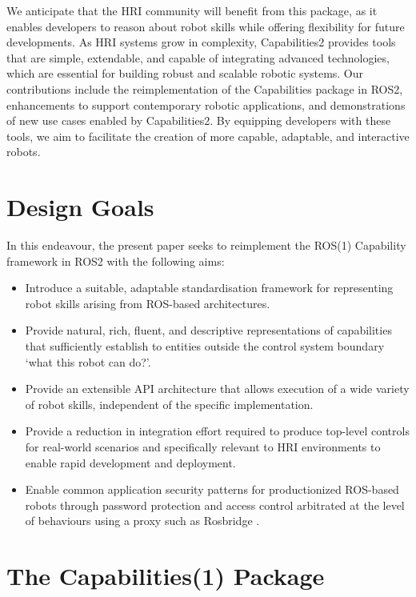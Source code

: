 \documentclass[conference]{IEEEtran}
\begin{document}
We anticipate that the HRI community will benefit from this package, as it enables developers to reason about robot skills while offering flexibility for future developments. As HRI systems grow in complexity, Capabilities2 provides tools that are simple, extendable, and capable of integrating advanced technologies, which are essential for building robust and scalable robotic systems. Our contributions include the reimplementation of the Capabilities package in ROS2, enhancements to support contemporary robotic applications, and demonstrations of new use cases enabled by Capabilities2. By equipping developers with these tools, we aim to facilitate the creation of more capable, adaptable, and interactive robots.

\section{Design Goals}
In this endeavour, the present paper seeks to reimplement the ROS(1) Capability framework in ROS2 with the following aims:
\begin{itemize}
\item Introduce a suitable, adaptable standardisation framework for representing robot skills arising from ROS-based architectures.
\item Provide natural, rich, fluent, and descriptive representations of capabilities that sufficiently establish to entities outside the control system boundary ‘what this robot can do?’.
\item Provide an extensible API architecture that allows execution of a wide variety of robot skills, independent of the specific implementation.
\item Provide a reduction in integration effort required to produce top-level controls for real-world scenarios and specifically relevant to HRI environments to enable rapid development and deployment.
\item Enable common application security patterns for productionized ROS-based robots through password protection and access control arbitrated at the level of behaviours using a proxy such as Rosbridge \cite{crick2012ros}.
\end{itemize}

\section{The Capabilities(1) Package}
\end{document}
